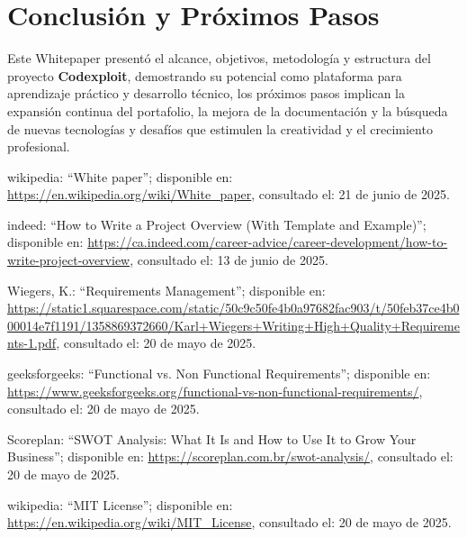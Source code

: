 \documentclass[10pt, a4paper, oneside]{article}
\begin{document}
\section{Conclusión y Próximos Pasos}

Este Whitepaper presentó el alcance, objetivos, metodología y estructura del proyecto \textbf{Codexploit}, demostrando su potencial como plataforma para aprendizaje práctico y desarrollo técnico, los próximos pasos implican la expansión continua del portafolio, la mejora de la documentación y la búsqueda de nuevas tecnologías y desafíos que estimulen la creatividad y el crecimiento profesional.\newpage

%

\begin{thebibliography}{}{
\fontsize{9pt}{10pt}\selectfont

wikipedia: ``White paper''; disponible en: \url{https://en.wikipedia.org/wiki/White_paper}, consultado el: 21 de junio de 2025.

indeed: ``How to Write a Project Overview (With Template and Example)''; disponible en: \url{https://ca.indeed.com/career-advice/career-development/how-to-write-project-overview}, consultado el: 13 de junio de 2025.

Wiegers, K.: ``Requirements Management''; disponible en: \url{https://static1.squarespace.com/static/50c9c50fe4b0a97682fac903/t/50feb37ce4b000014e7f1191/1358869372660/Karl+Wiegers+Writing+High+Quality+Requirements-1.pdf}, consultado el: 20 de mayo de 2025.

geeksforgeeks: ``Functional vs. Non Functional Requirements''; disponible en: \url{https://www.geeksforgeeks.org/functional-vs-non-functional-requirements/}, consultado el: 20 de mayo de 2025.

Scoreplan: ``SWOT Analysis: What It Is and How to Use It to Grow Your Business''; disponible en: \url{https://scoreplan.com.br/swot-analysis/}, consultado el: 20 de mayo de 2025.

wikipedia: ``MIT License''; disponible en: \url{https://en.wikipedia.org/wiki/MIT_License}, consultado el: 20 de mayo de 2025.

}
\end{thebibliography}
\end{document}
